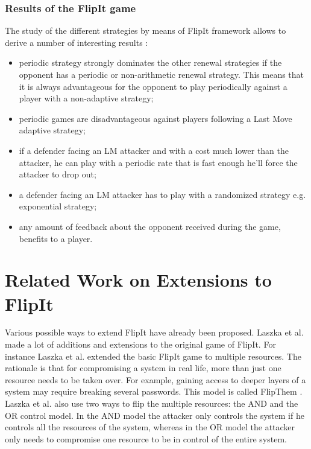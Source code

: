 \subsubsection{Results of the FlipIt game}
The study of the different strategies by means of FlipIt framework allows to derive a number of interesting results \cite{FlipIt}:  
\begin{itemize}
\item periodic strategy strongly dominates the other renewal strategies if the opponent has a periodic or non-arithmetic renewal strategy. This means that it is always advantageous for the opponent to play periodically against a player with a non-adaptive strategy;
\item periodic games are disadvantageous against players following a Last Move adaptive strategy;
\item if a defender facing an LM attacker and with a cost much lower than the attacker, he can play with a periodic rate that is fast enough he'll force the attacker to drop out;
\item a defender facing an LM attacker has to play with a randomized strategy e.g. exponential strategy;
\item any amount of feedback about the opponent received during the game, benefits to a player.
\end{itemize}
 

 
\section{Related Work on Extensions to FlipIt}
\label{ch1:extendedWork}

Various possible ways to extend FlipIt have already been proposed. 
Laszka et al. made a lot of additions and extensions to the original game of FlipIt. For instance Laszka et al. extended the basic FlipIt game to multiple resources. The rationale is that for compromising a system in real life, more than just one resource needs to be taken over. For example, gaining access to deeper layers of a system may require breaking several passwords. This model is called FlipThem \cite{FlipThem}. Laszka et al. also use two ways to flip the multiple resources: the AND and the OR control model. In the AND model the attacker only controls the system if he controls all the resources of the system, whereas in the OR model the attacker only needs to compromise one resource to be in control of the entire system. \\

